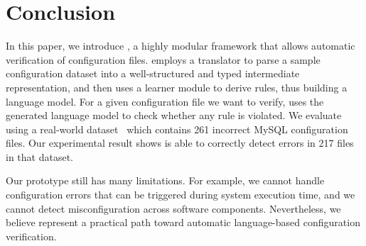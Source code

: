 
\section{Conclusion}

In this paper, we introduce \app, a highly modular framework 
that allows automatic verification of configuration files.
\app employs a translator to parse a sample configuration dataset
into a well-structured and typed intermediate representation,
and then uses a learner module to derive rules, 
thus building a language model.
For a given configuration file we want to verify,
\app uses the generated language model to check
whether any rule is violated.
We evaluate \app using a real-world dataset~\cite{configdataset}
which contains 261 incorrect MySQL configuration files.
Our experimental result shows \app is able to
correctly detect errors in 217 files in that dataset.

Our \app prototype still has many limitations. 
For example, we cannot handle configuration errors that can be 
triggered during system execution time, 
and we cannot detect misconfiguration across software components. 
Nevertheless, we believe \app represent a practical path
toward automatic language-based configuration verification.


